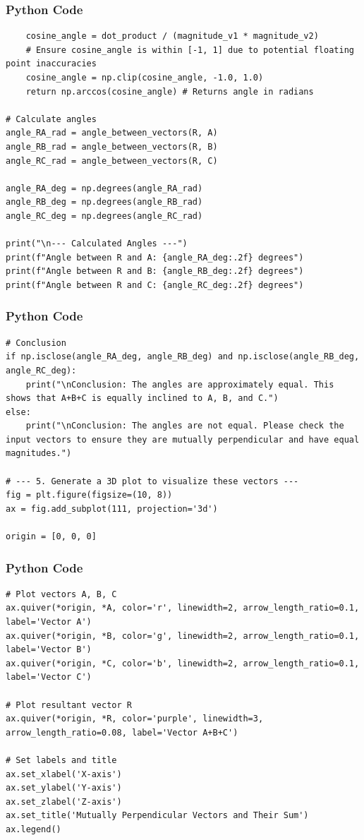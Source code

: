 \documentclass{beamer}
\begin{document}
\begin{frame}[fragile]
\frametitle{Python Code }
\begin{lstlisting}
    cosine_angle = dot_product / (magnitude_v1 * magnitude_v2)
    # Ensure cosine_angle is within [-1, 1] due to potential floating point inaccuracies
    cosine_angle = np.clip(cosine_angle, -1.0, 1.0)
    return np.arccos(cosine_angle) # Returns angle in radians

# Calculate angles
angle_RA_rad = angle_between_vectors(R, A)
angle_RB_rad = angle_between_vectors(R, B)
angle_RC_rad = angle_between_vectors(R, C)

angle_RA_deg = np.degrees(angle_RA_rad)
angle_RB_deg = np.degrees(angle_RB_rad)
angle_RC_deg = np.degrees(angle_RC_rad)

print("\n--- Calculated Angles ---")
print(f"Angle between R and A: {angle_RA_deg:.2f} degrees")
print(f"Angle between R and B: {angle_RB_deg:.2f} degrees")
print(f"Angle between R and C: {angle_RC_deg:.2f} degrees")
\end{lstlisting}
\end{frame}

\begin{frame}[fragile]
\frametitle{Python Code}
\begin{lstlisting}
# Conclusion
if np.isclose(angle_RA_deg, angle_RB_deg) and np.isclose(angle_RB_deg, angle_RC_deg):
    print("\nConclusion: The angles are approximately equal. This shows that A+B+C is equally inclined to A, B, and C.")
else:
    print("\nConclusion: The angles are not equal. Please check the input vectors to ensure they are mutually perpendicular and have equal magnitudes.")

# --- 5. Generate a 3D plot to visualize these vectors ---
fig = plt.figure(figsize=(10, 8))
ax = fig.add_subplot(111, projection='3d')

origin = [0, 0, 0]
\end{lstlisting}
\end{frame}

\begin{frame}[fragile]
\frametitle{Python Code }
\begin{lstlisting}
# Plot vectors A, B, C
ax.quiver(*origin, *A, color='r', linewidth=2, arrow_length_ratio=0.1, label='Vector A')
ax.quiver(*origin, *B, color='g', linewidth=2, arrow_length_ratio=0.1, label='Vector B')
ax.quiver(*origin, *C, color='b', linewidth=2, arrow_length_ratio=0.1, label='Vector C')

# Plot resultant vector R
ax.quiver(*origin, *R, color='purple', linewidth=3, arrow_length_ratio=0.08, label='Vector A+B+C')

# Set labels and title
ax.set_xlabel('X-axis')
ax.set_ylabel('Y-axis')
ax.set_zlabel('Z-axis')
ax.set_title('Mutually Perpendicular Vectors and Their Sum')
ax.legend()
\end{lstlisting}
\end{frame}
\end{document}
